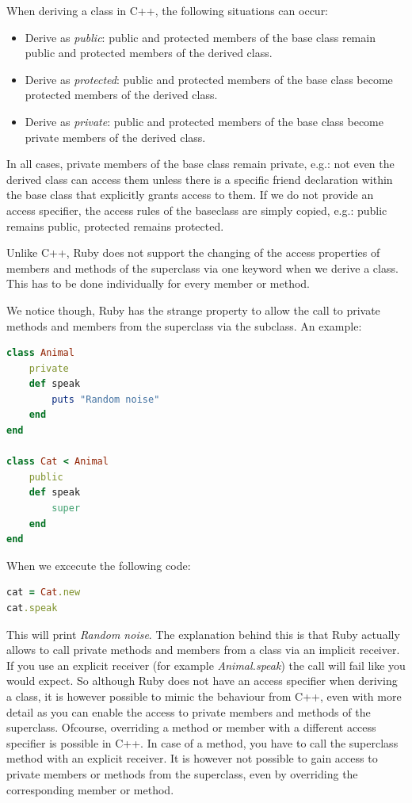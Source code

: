 \documentclass[10pt,a4paper,twocolumn]{article}
\begin{document}
When deriving a class in C++, the following situations can occur:
\begin{itemize}
\item Derive as \textit{public}: public and protected members of the base class remain public and protected members of the derived class.
\item Derive as \textit{protected}: public and protected members of the base class become protected members of the derived class.
\item Derive as \textit{private}: public and protected members of the base class become private members of the derived class.
\end{itemize}

In all cases, private members of the base class remain private, e.g.: not even the derived class can access them unless there is a specific friend declaration within the base class that explicitly grants access to them. If we do not provide an access specifier, the access rules of the baseclass are simply copied, e.g.: public remains public, protected remains protected.

Unlike C++, Ruby does not support the changing of the access properties of members and methods of the superclass via one keyword when we derive a class. This has to be done individually for every member or method.

We notice though, Ruby has the strange property to allow the call to private methods and members from the superclass via the subclass. An example:

\begin{lstlisting}[language=Ruby]
class Animal
	private
	def speak
		puts "Random noise"
	end
end

class Cat < Animal
	public
	def speak
		super
	end
end
\end{lstlisting}

When we excecute the following code:

\begin{lstlisting}[language=Ruby]
cat = Cat.new
cat.speak
\end{lstlisting}

This will print \textit{Random noise}. The explanation behind this is that Ruby actually allows to call private methods and members from a class via an implicit receiver. If you use an explicit receiver (for example \textit{Animal.speak}) the call will fail like you would expect. So although Ruby does not have an access specifier when deriving a class, it is however possible to mimic the behaviour from C++, even with more detail as you can enable the access to private members and methods of the superclass. Ofcourse, overriding a method or member with a different access specifier is possible in C++. In case of a method, you have to call the superclass method with an explicit receiver. It is however not possible to gain access to private members or methods from the superclass, even by overriding the corresponding member or method.
\end{document}
